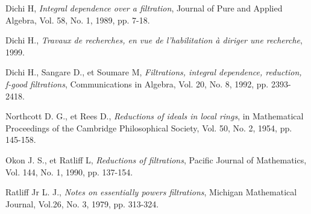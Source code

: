\begin{thebibliography}{99}
	
	
	 Dichi H,\textit{ Integral dependence over a filtration}, Journal of Pure and Applied Algebra, Vol. 58, No. 1, 1989, pp. 7-18. 
	
	 Dichi H., \textit{Travaux de recherches, en vue de l'habilitation à diriger une recherche}, 1999.	
	
	 Dichi H., Sangare D., et Soumare M,\textit{ Filtrations, integral dependence, reduction, f-good filtrations}, Communications in Algebra, Vol. 20, No. 8, 1992, pp. 2393-2418.
	
	 Northcott D. G., et Rees D.,\textit{ Reductions of ideals in local rings}, in Mathematical Proceedings of the Cambridge Philosophical Society, Vol. 50, No. 2, 1954, pp. 145-158.
	
	 Okon J. S., et Ratliff L,\textit{ Reductions of filtrations}, Pacific Journal of Mathematics, Vol. 144, No. 1, 1990, pp. 137-154.
	
	 Ratliff Jr L. J.,\textit{ Notes on essentially powers filtrations}, Michigan Mathematical Journal, Vol.26, No. 3, 1979, pp. 313-324.

\end{thebibliography}
